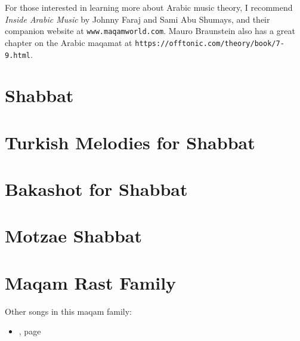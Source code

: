 \documentclass[letterpaper]{memoir}
\newcommand{\song}[2]{}
\newcommand{\songref}[1]{\nameref{#1}, page \pageref{#1}}
\begin{document}
For those interested in learning more about
Arabic music theory, I recommend \textit{Inside Arabic Music} by Johnny 
Faraj and Sami Abu Shumays, and their companion website at \texttt{www.maqamworld.com}.
Mauro Braunstein also has a great chapter on the Arabic maqamat at 
\texttt{https://offtonic.com/theory/book/7-9.html}.




\chapter{Shabbat}
\song{Ashir La'el Asher Shavat}{Ashir_Lael_Asher_Shavat.pdf}

\chapter{Turkish Melodies for Shabbat}
\song{Yoducha Rayonai}{Yoducha_Rayonai_Turkish_with_octave_up.pdf}
\song{Yom HaShabbat Ein Kamohu}{Yom_HaShabbat_Ein_Kamohu_Turkish.pdf}
\song{Ki Eshmerah Shabbat}{Ki_Eshmerah_Shabbat_Turkish.pdf}

\chapter{Bakashot for Shabbat}
\song{L'maancha v'lo Lanu}{Lmaancha_vlo_lanu.pdf}
\song{Yom Zeh Shiru La'el}{Yom_Zeh_Shiru_Lael.pdf}
\song{Yoducha Rayonai}{Yoducha_Rayonai.pdf}
\song{Yoducha Rayonai \#2}{Yoducha_Rayonai_2.pdf}
\song{Yah Ribon Alam}{Yah_Ribon_Alam.pdf}
\song{Yah Ribon Alam \#2}{Yah_Ribon_Alam_2.pdf}
\song{Yedid Nefesh}{Yedid_Nefesh.pdf}
\song{Agadelcha}{Agadelcha.pdf}

\chapter{Motzae Shabbat}
\song{Al Tira Avdi Yaakov}{Al_Tira_Avdi_Yaakov.pdf}

\chapter{Maqam Rast Family}
Other songs in this maqam family:
\begin{itemize}
   \item \songref{Yah_Ribon_Alam.pdf}
\end{itemize}
\song{Eli Yah Eli}{Eli_Yah_Eli.pdf} %
\song{Riva Riva}{Riva_Riva.pdf}
\song{El Hon}{El_Hon.pdf}
\song{Boee B'rinah}{Boee_Brinah.pdf}
\song{N'imah Li}{Nimah_Li.pdf}
\song{Rachum Bach Yagel Levavi}{Rachum_Bach_Yagel_Levavi.pdf}
\end{document}
